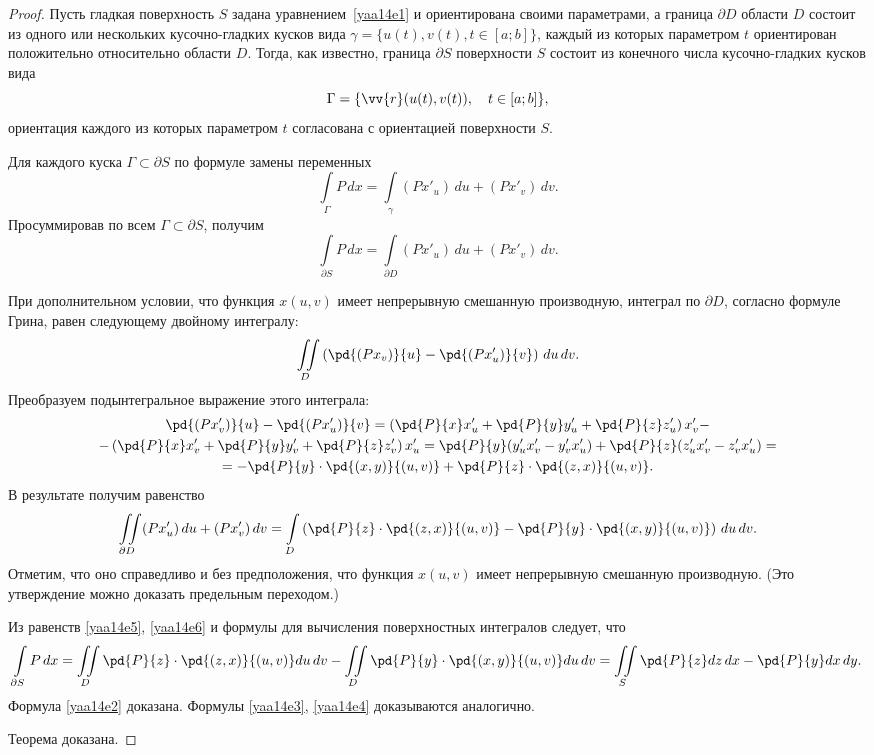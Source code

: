 \begin{proof}
Пусть гладкая поверхность $S$ задана уравнением~\eqref{yaa14e1} и ориентирована своими параметрами, а граница $\partial D$ области $D$ состоит из одного или нескольких кусочно-гладких кусков вида $\gamma = \{u(t),v(t),t\in[a;b]\}$, каждый из которых параметром $t$ ориентирован положительно относительно области $D$. Тогда, как известно, граница $\partial S$ поверхности $S$ состоит из конечного числа кусочно-гладких кусков вида %
$$
\Gamma = \{\vv{r}(u(t),v(t)),\quad t\in[a;b]\},
$$
ориентация каждого из которых параметром $t$ согласована с ориентацией поверхности $S$.

Для каждого куска $\Gamma\subset\partial S$ по формуле замены переменных
$$
\int\limits_{\Gamma} P\,dx = \int\limits_\gamma (Px'_u)\,du+(Px'_v)\,dv.
$$
Просуммировав по всем $\Gamma\subset\partial S$, получим
\begin{equation} \label{yaa14e5}
\int\limits_{\partial S} P\,dx = \int\limits_{\partial D} (Px'_u)\,du+(Px'_v)\,dv.
\end{equation}

При дополнительном условии, что функция $x(u,v)$ имеет непрерывную смешанную производную, интеграл по $\partial D$, согласно формуле Грина, равен следующему двойному интегралу:
$$
\iint\limits_D\left(\pd{(Px_v)}{u} -\pd{(Px'_u)}{v}\right)\,du\,dv.
$$
Преобразуем подынтегральное выражение этого интеграла:
\begin{multline*}
\pd{(Px'_v)}{u} - \pd{(Px'_u)}{v}
=\left(\pd{P}{x}x'_u+\pd{P}{y}y'_u+\pd{P}{z}z'_u\right)x'_v-\\-\left(\pd{P}{x}x'_v+\pd{P}{y}y'_v+\pd{P}{z}z'_v\right)x'_u = \pd{P}{y}(y'_ux'_v-y'_vx'_u)+\pd{P}{z}(z'_ux'_v-z'_vx'_u)=\\=-\pd{P}{y}\cdot \pd{(x,y)}{(u,v)}+\pd{P}{z}\cdot\pd{(z,x)}{(u,v)}.
\end{multline*}
В результате получим равенство
\begin{equation} \label{yaa14e6}
\iint\limits_{\partial D} (Px'_u)\,du+(Px'_v)\,dv = \int\limits_D\left(\pd{P}{z}\cdot\pd{(z,x)}{(u,v)}-\pd{P}{y}\cdot \pd{(x,y)}{(u,v)}\right)\,du\,dv.
\end{equation}
Отметим, что оно справедливо и без предположения, что функция $x(u,v)$ имеет непрерывную смешанную производную. (Это утверждение можно доказать предельным переходом.)

Из равенств \eqref{yaa14e5}, \eqref{yaa14e6} и формулы для вычисления поверхностных интегралов следует, что
$$
\int\limits_{\partial S} P\,dx = \iint\limits_D \pd{P}{z}\cdot\pd{(z,x)}{(u,v)}du\,dv -\iint\limits_D \pd{P}{y}\cdot\pd{(x,y)}{(u,v)}du\,dv = \iint\limits_S \pd{P}{z}dz\,dx-\pd{P}{y}dx\,dy.
$$
Формула \eqref{yaa14e2} доказана. Формулы \eqref{yaa14e3}, \eqref{yaa14e4} доказываются аналогично.

Теорема доказана.
\end{proof}

